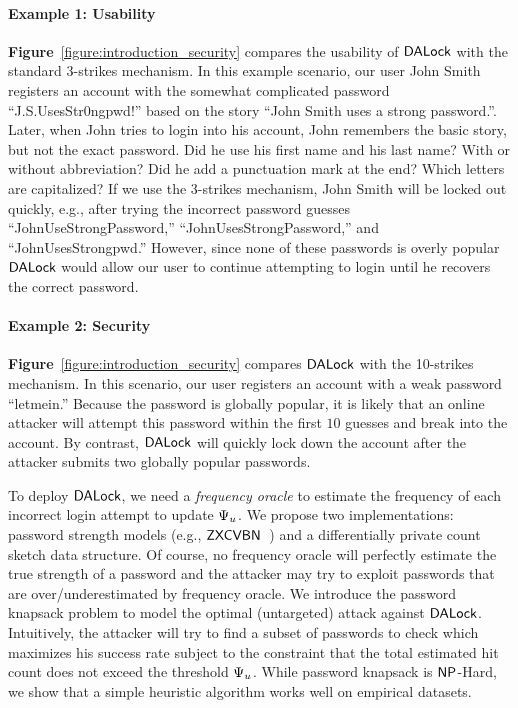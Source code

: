 \paragraph{Example 1: Usability} \textbf{Figure}~\ref{figure:introduction_security} compares the usability of $\mathsf{DALock}$ with the standard 3-strikes mechanism. In this example scenario, our user John Smith registers an account with the somewhat complicated password ``J.S.UsesStr0ngpwd!'' based on the story ``John Smith uses a strong password.''. Later, when John tries to login into his account, John remembers the basic story, but not the exact password. Did he use his first name and his last name? With or without abbreviation? Did he add a punctuation mark at the end? Which letters are capitalized? If we use the 3-strikes mechanism, John Smith will be locked out quickly, e.g., after trying the incorrect password guesses ``JohnUseStrongPassword,'' ``JohnUsesStrongPassword,'' and ``JohnUsesStrongpwd.'' However, since none of these passwords is overly popular $\mathsf{DALock}$ would allow our user to continue attempting to login until he recovers the correct password. 



\paragraph{Example 2: Security} \textbf{Figure}~\ref{figure:introduction_security} compares $\mathsf{DALock}$ with the 10-strikes mechanism. In this scenario, our user registers an account with a weak password ``letmein.'' Because the password is globally popular, it is likely that an online attacker will attempt this password within the first $10$ guesses and break into the account. By contrast, $\mathsf{DALock}$ will quickly lock down the account after the attacker submits two globally popular passwords. 


To deploy $\mathsf{DALock}$, we need a \textit{frequency oracle} to estimate the frequency of each incorrect login attempt to update $\Psi_{u}$. We propose two implementations: password strength models (e.g., $\mathsf{ZXCVBN}$~\cite{USENIX:Wheeler16}) and a differentially private count sketch data structure. Of course, no frequency oracle will perfectly estimate the true strength of a password and the attacker may try to exploit passwords that are over/underestimated by frequency oracle. We introduce the password knapsack problem to model the optimal (untargeted) attack against $\mathsf{DALock}$. Intuitively, the attacker will try to find a subset of passwords to check which maximizes his success rate subject to the constraint that the total estimated hit count does not exceed the threshold $\Psi_{u}$.  While password knapsack is $\mathsf{NP}$-Hard, we show that a simple heuristic algorithm works well on empirical datasets. 


